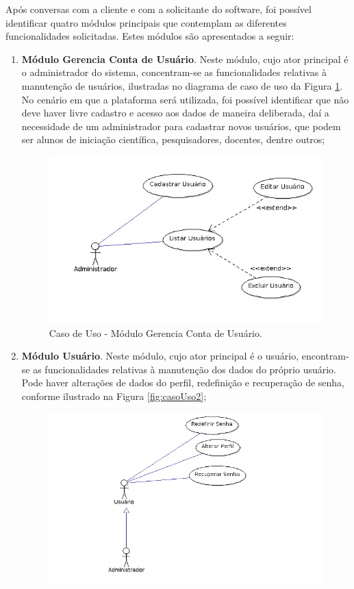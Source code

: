 Após conversas com a cliente e com a solicitante do software, foi possível identificar quatro módulos principais que contemplam as diferentes funcionalidades solicitadas. Estes módulos são apresentados a seguir:

\begin{enumerate}
	\item \textbf{Módulo Gerencia Conta de Usuário}. Neste módulo, cujo ator principal é o administrador do sistema, concentram-se as funcionalidades relativas à manutenção de usuários, ilustradas no diagrama de caso de uso da Figura \ref{fig:casoUso1}. No cenário em que a plataforma será utilizada, foi possível identificar que não deve haver livre cadastro e acesso aos dados de maneira deliberada, daí a necessidade de um administrador para cadastrar novos usuários, que podem ser alunos de iniciação científica, pesquisadores, docentes, dentre outros;
	\begin{figure}[H]
		\centering
		\includegraphics[scale=0.8]{img/uc001.png}
		\caption{Caso de Uso - Módulo Gerencia Conta de Usuário.}
		\label{fig:casoUso1}
	\end{figure}
	\item \textbf{Módulo Usuário}. Neste módulo, cujo ator principal é o usuário, encontram-se as funcionalidades relativas à manutenção dos dados do próprio usuário. Pode haver alterações de dados do perfil, redefinição e recuperação de senha, conforme ilustrado na Figura \ref{fig:casoUso2};
	\begin{figure}[H]
		\centering
		\includegraphics[scale=0.8]{img/uc002.png}

\end{figure}
\end{enumerate}
